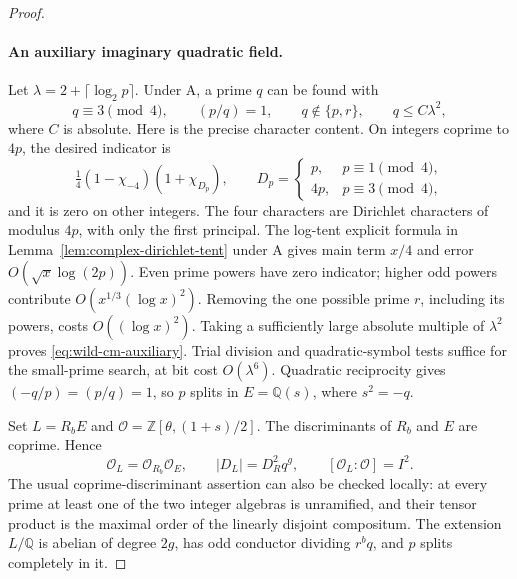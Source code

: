 \documentclass[11pt]{article}
\theoremstyle{definition}
\theoremstyle{remark}
\begin{document}
\begin{proof}
\paragraph{An auxiliary imaginary quadratic field.}
Let \(\lambda=2+\lceil\log_2p\rceil\).
Under \(\mathrm A\), a prime \(q\) can be found with
\begin{equation}
 q\equiv3\pmod4,\qquad (p/q)=1,\qquad
 q\notin\{p,r\},\qquad q\leq C\lambda^2,
 \label{eq:wild-cm-auxiliary}
\end{equation}
where \(C\) is absolute. Here is the precise character content.
On integers coprime to \(4p\), the desired indicator is
\[
 \tfrac14(1-\chi_{-4})(1+\chi_{D_p}),\qquad
 D_p=\begin{cases}p,&p\equiv1\pmod4,\\4p,&p\equiv3\pmod4,
 \end{cases}
\]
and it is zero on other integers. The four characters are
Dirichlet characters of modulus \(4p\), with only the first
principal. The log-tent explicit formula in
Lemma~\ref{lem:complex-dirichlet-tent} under \(\mathrm A\)
gives main term \(x/4\) and error
\(O(\sqrt x\log(2p))\). Even prime powers have zero indicator;
higher odd powers contribute
\(O(x^{1/3}(\log x)^2)\). Removing the one possible prime
\(r\), including its powers, costs \(O((\log x)^2)\).
Taking a sufficiently large absolute multiple of \(\lambda^2\)
proves \eqref{eq:wild-cm-auxiliary}. Trial division and quadratic-symbol tests suffice
for the small-prime search, at bit cost \(O(\lambda^6)\).
Quadratic reciprocity gives
\(({-q}/p)=(p/q)=1\), so \(p\) splits in
\(E=\mathbb Q(s)\), where \(s^2=-q\).

Set \(L=R_bE\) and
\(\mathcal O=\mathbb Z[\theta,(1+s)/2]\).
The discriminants of \(R_b\) and \(E\) are coprime. Hence
\begin{equation}
 \mathcal O_L=\mathcal O_{R_b}\mathcal O_E,\qquad
 |D_L|=D_R^2q^g,\qquad [\mathcal O_L:\mathcal O]=I^2.
 \label{eq:wild-cm-order}
\end{equation}
The usual coprime-discriminant assertion can also be checked
locally: at every prime at least one of the two integer algebras
is unramified, and their tensor product is the maximal order of
the linearly disjoint compositum. The extension \(L/\mathbb Q\)
is abelian of degree \(2g\), has odd conductor dividing
\(r^bq\), and \(p\) splits completely in it.


\end{proof}
\end{document}
